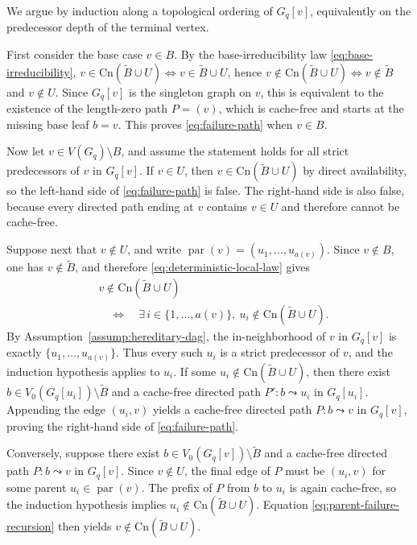 \documentclass[journal]{IEEEtran}
\makeatletter
\newcommand{\Cn}{\text{Cn}}
\numberwithin{equation}{section}
\renewenvironment{proof}[1][\proofname]{\par
  \pushQED{\qed}%
  \normalfont \topsep6\p@\@plus6\p@\relax
  \trivlist
  \item[\hskip\labelsep
        \itshape
    #1\@addpunct{.}]\ignorespaces
}{%
  \popQED\endtrivlist\@endpefalse
}
\makeatother
\begin{document}
\begin{proof}
We argue by induction along a topological ordering of \(G_q[v]\), equivalently
on the predecessor depth of the terminal vertex.

First consider the base case \(v\in B\).  By the base-irreducibility law
\eqref{eq:base-irreducibility},
\(v\in\Cn(\widetilde B\cup U)\Leftrightarrow v\in\widetilde B\cup U\), hence
\(v\notin\Cn(\widetilde B\cup U)\Leftrightarrow v\notin\widetilde B\) and
\(v\notin U\).
Since \(G_q[v]\) is the singleton graph on \(v\), this is equivalent to the
existence of the length-zero path \(P=(v)\), which is cache-free and starts at
the missing base leaf \(b=v\).  This proves \eqref{eq:failure-path} when
\(v\in B\).

Now let \(v\in V(G_q)\setminus B\), and assume the statement holds for all
strict predecessors of \(v\) in \(G_q[v]\).  If \(v\in U\), then
\(v\in\Cn(\widetilde B\cup U)\) by direct availability, so the left-hand side
of \eqref{eq:failure-path} is false.  The right-hand side is also false,
because every directed path ending at \(v\) contains \(v\in U\) and therefore
cannot be cache-free.

Suppose next that \(v\notin U\), and write
\(\operatorname{par}(v)=(u_1,\ldots,u_{a(v)})\).
Since \(v\notin B\), one has \(v\notin\widetilde B\), and therefore
\eqref{eq:deterministic-local-law} gives
\begin{equation}
  \begin{aligned}
    & v\notin\Cn(\widetilde B\cup U) \\
    & \quad\Longleftrightarrow\quad 
      \exists\, i\in\{1,\ldots,a(v)\},\ 
      u_i\notin\Cn(\widetilde B\cup U).
  \end{aligned}
\label{eq:parent-failure-recursion}
\end{equation}
By Assumption~\ref{assump:hereditary-dag}, the in-neighborhood of \(v\) in
\(G_q[v]\) is exactly \(\{u_1,\ldots,u_{a(v)}\}\).  Thus every such \(u_i\) is
a strict predecessor of \(v\), and the induction hypothesis applies to \(u_i\).
If some \(u_i\notin\Cn(\widetilde B\cup U)\), then there exist
\(b\in V_0(G_q[u_i])\setminus\widetilde B\) and a cache-free directed path
\(P':b\leadsto u_i\) in \(G_q[u_i]\).  Appending the edge \((u_i,v)\) yields a
cache-free directed path \(P:b\leadsto v\) in \(G_q[v]\), proving the
right-hand side of \eqref{eq:failure-path}.

Conversely, suppose there exist
\(b\in V_0(G_q[v])\setminus\widetilde B\) and a cache-free directed path
\(P:b\leadsto v\) in \(G_q[v]\).  Since \(v\notin U\), the final edge of \(P\)
must be \((u_i,v)\) for some parent \(u_i\in\operatorname{par}(v)\).  The
prefix of \(P\) from \(b\) to \(u_i\) is again cache-free, so the induction
hypothesis implies \(u_i\notin\Cn(\widetilde B\cup U)\).  Equation
\eqref{eq:parent-failure-recursion} then yields
\(v\notin\Cn(\widetilde B\cup U)\).
\end{proof}
\end{document}
